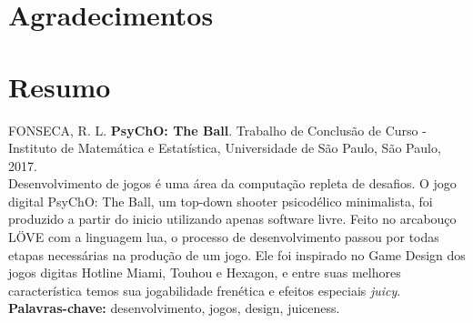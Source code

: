 \chapter*{Agradecimentos}


\chapter*{Resumo}

\noindent%
FONSECA, R. L. \textbf{PsyChO: The Ball}. Trabalho de Conclusão de Curso
 - Instituto de Matemática e Estatística, Universidade de São Paulo,
São Paulo, 2017.
\\

Desenvolvimento de jogos é uma área da computação repleta de desafios. O jogo digital
PsyChO: The Ball, um top-down shooter psicodélico minimalista, foi produzido a partir
do inicio utilizando apenas software livre. Feito no arcabouço LÖVE com a linguagem
lua, o processo de desenvolvimento passou por todas etapas necessárias na produção
de um jogo. Ele foi inspirado no Game Design dos jogos digitas Hotline Miami, Touhou
e Hexagon, e entre suas melhores característica temos sua jogabilidade frenética e
efeitos especiais \textit{juicy}.
\\

\noindent%
\textbf{Palavras-chave:} desenvolvimento, jogos, design, juiceness.
